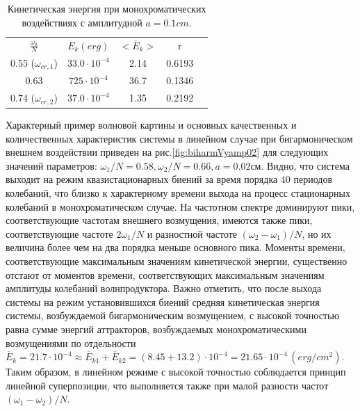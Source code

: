 \begin{table}
	\caption{  Кинетическая энергия при монохроматических воздействиях с амплитудной $a=0.1 cm$. }
	\begin{center}
		\begin{tabular}{|c|c|c|c|c|}
			\hline
			$\displaystyle \frac{\omega_0}{N}$ & $E_k (erg)$ &  $<\overline{E}_{k}>$  & r\\
			0.55 ($\omega_{cr,1}$) & $33.0 \cdot 10^{-4}              $& 2.14  & 0.6193     \\
			0.63                   & $725 \cdot 10^{-4}              $& 36.7  & 0.1346     \\
			0.74 ($\omega_{cr,2}$) & $37.0 \cdot 10^{-4}              $& 1.35  & 0.2192     \\
			\hline
		\end{tabular}
	\end{center}
	\label{tab:bolts01}
\end{table}

Характерный пример волновой картины и основных качественных и количественных характеристик системы в линейном случае при бигармоническом внешнем воздействии приведен на рис.\ref{fig:biharmVyamp02} для следующих значений параметров: $\omega_1/N=0.58, \omega_2/N=0.66, a=0.02$см. Видно, что система выходит на режим квазистационарных биений за время порядка $40$ периодов колебаний, что близко к характерному времени выхода на процесс стационарных колебаний в монохроматическом случае. На частотном спектре доминируют пики, соответствующие частотам внешнего возмущения, имеются также пики, соответствующие частоте  $2\omega_1/N$ и разностной частоте $(\omega_2-\omega_1)/N$, но их величина более чем на два порядка меньше основного пика. Моменты времени, соответствующие максимальным значениям кинетической энергии, существенно отстают от моментов времени, соответствующих максимальным значениям амплитуды колебаний волнпродуктора. Важно отметить, что после выхода системы на режим установившихся биений средняя кинетическая энергия системы, возбуждаемой бигармоническим возмущением, с высокой точностью равна сумме энергий аттракторов, возбуждаемых монохроматическими возмущениями по отдельности $\overline{E}_{k}= { 21.7 \cdot 10^{-4}  }\approx \overline{E}_{k1}+\overline{E}_{k2}= (8.45+13.2) \cdot 10^{-4} = 21.65 \cdot 10^{-4}\, (erg/cm^2) $. Таким образом, в линейном режиме с высокой точностью соблюдается принцип линейной суперпозиции, что выполняется также при малой разности частот $(\omega_1-\omega_2)/N$. 

